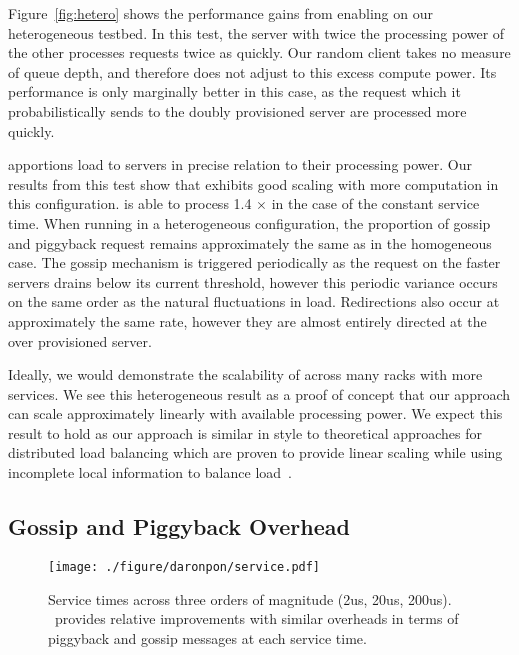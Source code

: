 Figure~\ref{fig:hetero} shows the performance gains from enabling \daronpon on
our heterogeneous testbed. In this test, the server with twice the processing
power of the other processes requests twice as quickly.  Our random client
takes no measure of queue depth, and therefore does not adjust to this excess
compute power. Its performance is only marginally better in this case, as the
request which it probabilistically sends to the doubly provisioned server are
processed more quickly. 

\daronpon apportions load to servers in precise relation to their processing
power. Our results from this test show that \daronpon exhibits good scaling with more computation in this configuration. 
%
\daronpon is able to process 1.4 $\times$ in the case of the constant service time.
%
When running in a heterogeneous configuration, the proportion of gossip and piggyback
request remains approximately the same as in the homogeneous case. The gossip
mechanism is triggered periodically as the request on the faster servers drains
below its current threshold, however this periodic variance occurs on the same
order as the natural fluctuations in load. Redirections also occur at
approximately the same rate, however they are almost entirely directed at the
over provisioned server.

Ideally, we would demonstrate the scalability of \daronpon across many racks
with more services. We see this heterogeneous result as a proof of concept that
our approach can scale approximately linearly with available processing power.
We expect this result to hold as our approach is similar in style to
theoretical approaches for distributed load balancing which are proven to
provide linear scaling while using incomplete local information to balance
load~\cite{lsq}.

\subsection{Gossip and Piggyback Overhead}
\label{sec:service_time}

\begin{figure}[ht!]
  \texttt{[image: ./figure/daronpon/service.pdf]}
    \caption{Service times across three orders of magnitude (2us, 20us,
    200us). \daronpon\ provides relative improvements with similar
    overheads in terms of piggyback and gossip messages at each
    service time.
    }
  \label{fig:service}
\end{figure}


